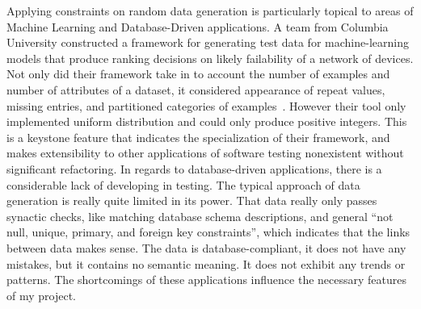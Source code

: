 Applying constraints on random data generation is particularly topical to areas of Machine Learning and Database-Driven applications. A team from Columbia University constructed a framework for generating test data for machine-learning models that produce ranking decisions on likely failability of a network of devices. Not only did their framework take in to account the number of examples and number of attributes of a dataset, it considered appearance of repeat values, missing entries, and partitioned categories of examples~\cite{Murphy:2007:PRT:1292414.1292425,Murphy:Kaiser}. However their tool only implemented uniform distribution and could only produce positive integers. This is a keystone feature that indicates the specialization of their framework, and makes extensibility to other applications of software testing nonexistent without significant refactoring. In regards to database-driven applications, there is a considerable lack of developing in testing. The typical approach of data generation is really quite limited in its power. That data really only passes synactic checks, like matching database schema descriptions, and general ``not null, unique, primary, and foreign key constraints'', which indicates that the links between data makes sense. The data is database-compliant, it does not have any mistakes, but it contains no semantic meaning. It does not exhibit any trends or patterns. The shortcomings of these applications influence the necessary features of my project.
